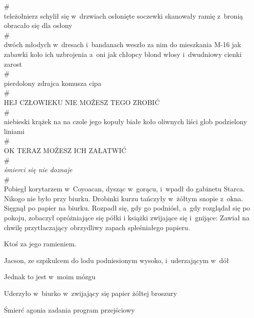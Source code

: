 \documentclass[oneside,polish,11pt,sfheadings]{mwbk}
\begin{document}
\#\\

teleżołnierz schylił się w~drzwiach osłonięte soczewki skanowały ramię z~bronią obracało się dla osłony\\

\#\\

dwóch młodych w~dresach i~bandanach weszło za nim do mieszkania M-16 jak
zabawki koło ich uzbrojenia a~oni jak chłopcy blond włosy i~dwudniowy
cienki zarost\\

\#\\


pierdolony zdrajca komusza cipa\\

\#\\

HEJ CZŁOWIEKU NIE MOŻESZ TEGO ZROBIĆ\\

\#\\

niebieski krążek na na czole jego kopuły białe koło oliwnych liści glob
podzielony liniami\\

\#\\

OK TERAZ MOŻESZ ICH ZAŁATWIĆ\\

\#\\

\emph{śmierci się nie doznaje}\\

\#\\ 

Pobiegł korytarzem w~Coyoacan, dysząc w~gorącu, i~wpadł do gabinetu
Starca. Nikogo nie było przy biurku. Drobinki kurzu tańczyły w~żółtym
snopie z~okna. Sięgnął po papier na biurku. Rozpadł się, gdy go
podniósł, a~gdy rozglądał się po pokoju, zobaczył opróżniające się półki
i książki zwijające się i~gnijące: Zawiał na chwilę przytłaczający
obrzydliwy zapach spleśniałego papieru.

Ktoś za jego ramieniem.

Jacson, ze szpikulcem do lodu podniesionym wysoko, i~uderzającym w~dół

Jednak to jest w~moim mózgu

Uderzyło w~biurko w~zwijający się papier żółtej broszury

Śmierć agonia zadania program przejściowy
\end{document}
